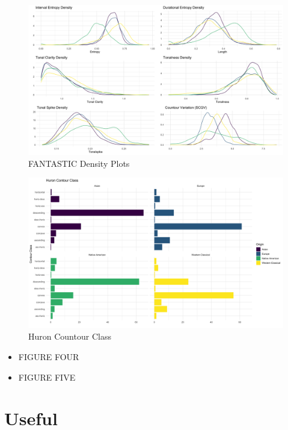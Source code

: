 \documentclass[english,man]{apa6}
\providecommand{\tightlist}{%
  \setlength{\itemsep}{0pt}\setlength{\parskip}{0pt}}
\begin{document}
\begin{figure}
\centering
\includegraphics{../img/corpora_emergent.png}
\caption{FANTASTIC Density Plots}
\end{figure}

\begin{figure}
\centering
\includegraphics{../img/huron_recreation.png}
\caption{Huron Countour Class}
\end{figure}

\begin{itemize}
\tightlist
\item
  FIGURE FOUR
\item
  FIGURE FIVE
\end{itemize}

\hypertarget{useful}{%
\section{Useful}\label{useful}}
\end{document}
